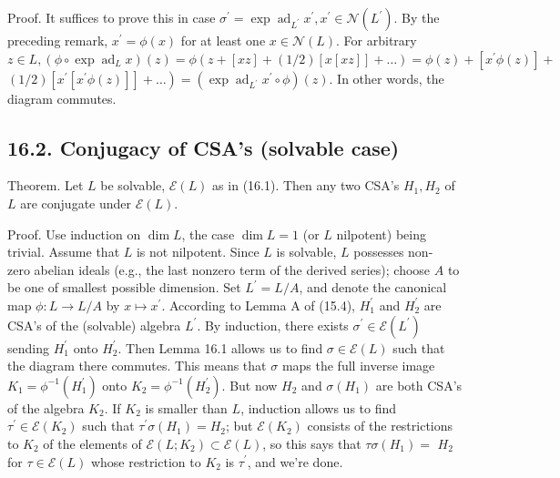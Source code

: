 \documentclass[10pt]{article}
\begin{document}
Proof. It suffices to prove this in case $\sigma^{\prime}=\exp \operatorname{ad}_{L^{\prime}} x^{\prime}, x^{\prime} \in \mathscr{N}\left(L^{\prime}\right)$. By the preceding remark, $x^{\prime}=\phi(x)$ for at least one $x \in \mathscr{N}(L)$. For arbitrary $z \in L,\left(\phi \circ \exp \operatorname{ad}_{L} x\right)(z)=\phi(z+[x z]+(1 / 2)[x[x z]]+\ldots)=\phi(z)+\left[x^{\prime} \phi(z)\right]+$ $\left.(1 / 2)\left[x^{\prime}\left[x^{\prime} \phi(z)\right]\right]+\ldots\right)=\left(\exp \operatorname{ad}_{L^{\prime}} x^{\prime} \circ \phi\right)(z)$. In other words, the diagram commutes.

\subsection*{16.2. Conjugacy of CSA's (solvable case)}
Theorem. Let $L$ be solvable, $\mathscr{E}(L)$ as in (16.1). Then any two CSA's $H_{1}, H_{2}$ of $L$ are conjugate under $\mathscr{E}(L)$.

Proof. Use induction on $\operatorname{dim} L$, the case $\operatorname{dim} L=1$ (or $L$ nilpotent) being trivial. Assume that $L$ is not nilpotent. Since $L$ is solvable, $L$ possesses non-\\
zero abelian ideals (e.g., the last nonzero term of the derived series); choose $A$ to be one of smallest possible dimension. Set $L^{\prime}=L / A$, and denote the canonical map $\phi: L \rightarrow L / A$ by $x \mapsto x^{\prime}$. According to Lemma A of (15.4), $H_{1}^{\prime}$ and $H_{2}^{\prime}$ are CSA's of the (solvable) algebra $L^{\prime}$. By induction, there exists $\sigma^{\prime} \in \mathscr{E}\left(L^{\prime}\right)$ sending $H_{1}^{\prime}$ onto $H_{2}^{\prime}$. Then Lemma 16.1 allows us to find $\sigma \in \mathscr{E}(L)$ such that the diagram there commutes. This means that $\sigma$ maps the full inverse image $K_{1}=\phi^{-1}\left(H_{1}^{\prime}\right)$ onto $K_{2}=\phi^{-1}\left(H_{2}^{\prime}\right)$. But now $H_{2}$ and $\sigma\left(H_{1}\right)$ are both CSA's of the algebra $K_{2}$. If $K_{2}$ is smaller than $L$, induction allows us to find $\tau^{\prime} \in \mathscr{E}\left(K_{2}\right)$ such that $\tau^{\prime} \sigma\left(H_{1}\right)=H_{2}$; but $\mathscr{E}\left(K_{2}\right)$ consists of the restrictions to $K_{2}$ of the elements of $\mathscr{E}\left(L ; K_{2}\right) \subset \mathscr{E}(L)$, so this says that $\tau \sigma\left(H_{1}\right)=$ $H_{2}$ for $\tau \in \mathscr{E}(L)$ whose restriction to $K_{2}$ is $\tau^{\prime}$, and we're done.
\end{document}

